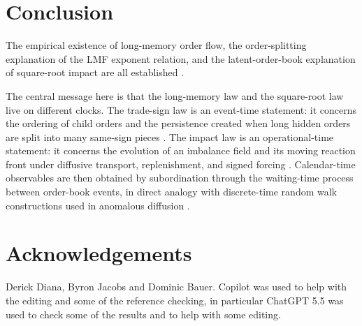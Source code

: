 \documentclass[5p,final]{elsarticle}
\begin{document}
\section{Conclusion}
\label{sec:conclusion}

The empirical existence of long-memory order flow, the order-splitting explanation of the LMF exponent relation, and the latent-order-book explanation of square-root impact are all established \citep{lillo2005theory,toth2011anomalous,donier2015fully,sato2023prl,sato2024jsp,benzaquen2018multi}. 

The central message here is that the long-memory law and the square-root law live on different clocks. The trade-sign law is an event-time statement: it concerns the ordering of child orders and the persistence created when long hidden orders are split into many same-sign pieces \cite{lillo2005theory,sato2023prl}. The impact law is an operational-time statement: it concerns the evolution of an imbalance field and its moving reaction front under diffusive transport, replenishment, and signed forcing \cite{toth2011anomalous,donier2015fully}. Calendar-time observables are then obtained by subordination through the waiting-time process between order-book events, in direct analogy with discrete-time random walk constructions used in anomalous diffusion \cite{angstmann2015dtrw,meerschaert2012fractional,diana2024anomalous}.

\section{Acknowledgements}

Derick Diana, Byron Jacobs and Dominic Bauer. Copilot was used to help with the editing and some of the reference checking, in particular ChatGPT 5.5 was used to check some of the results and to help with some editing.  
%

\end{document}

